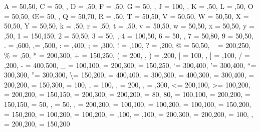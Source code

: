    {
     A = {50,50},
     C = {50,  },
     D = {  ,50},
     F = {  ,50},
     G = {50,  },
     J = {100,  },
     K = {  ,50},
     L = {  ,50},
     O = {50,50},
   \OE = {50,  },
     Q = {50,70},
     R = {  ,50},
     T = {50,50},
     V = {50,50},
     W = {50,50},
     X = {50,50},
     Y = {50,50},
     k = {  ,50},
     r = {  ,50},
     t = {  ,50},
     v = {50,50},
     w = {50,50},
     x = {50,50},
     y = {  ,50},
     1 = {150,150},
     2 = {50,50},
     3 = {50,  },
     4 = {100,50},
     6 = {50,  },
     7 = {50,80},
     9 = {50,50},
     . = { ,600},
    {,}= { ,500},
     : = { ,400},
     ; = { ,300},
     ! = { ,100},
     ? = { ,200},
     @ = {50,50},
     ~ = {200,250},
    \% = {  ,50},
     * = {200,300},
     + = {150,250},
     ( = {200,   },    ) = {   ,200},
     [ = {100,   },    ] = {   ,100},
     / = { ,200},
     - = {400,500},
     _ = {100,100},
     \textendash       = {200,300},   \textemdash        = {150,250},
     \textquoteleft    = {300,400},   \textquoteright    = {300,400},
     \textquotedblleft = {300,300},   \textquotedblright = {300,300},
     \textbackslash    = {150,200},
     \quotesinglbase   = {400,400},   \quotedblbase      = {300,300},
     \guilsinglleft    = {400,300},   \guilsinglright    = {300,400},
     \guillemotleft    = {200,200},   \guillemotright    = {150,300},
     \textexclamdown   = {100,   },   \textquestiondown  = {100,   },
     \textbraceleft    = {200,   },   \textbraceright    = {   ,300},
     \textless         = {200,100},   \textgreater       = {100,200},
     \texttwelveudash          = {200,200},
     \textthreequartersemdash  = {150,150},
     \textasteriskcentered     = {200,300},
     \textminus                = {200,200},
     \textdagger               = { 80, 80},
     \textbardbl               = {100,100},
     \textbullet               = {200,200},
     \texttrademark            = {150,150},
     \textcent                 = { 50,   },
     \textsterling             = { 50,   },
     \textbrokenbar            = {200,200},
     \textcopyright            = {100,100},
     \textordfeminine          = {100,200},
     \textregistered           = {100,100},
     \textdegree               = {150,200},
     \textpm                   = {150,200},
     \texttwosuperior          = {100,200},
     \textthreesuperior        = {100,200},
     \textmu                   = {   ,100},
     \textparagraph            = {   ,100},
     \textonesuperior          = {200,300},
     \textordmasculine         = {200,200},
     \texteuro                 = {100,   },
     \texttimes                = {200,200},
     \textdiv                  = {150,200}
   }

